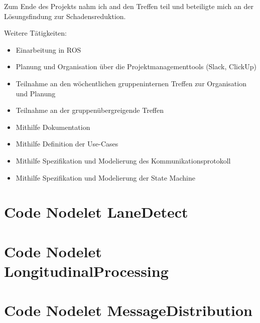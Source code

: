 \documentclass[a4paper, 12pt, titlepage]{scrartcl}
\begin{document}
{	Zum Ende des Projekts nahm ich and den Treffen teil und beteiligte mich an der Lösungsfindung zur Schadensreduktion.
	
	Weitere Tätigkeiten:
	\begin{itemize}
	\item Einarbeitung in ROS
	\item Planung und Organisation über die Projektmanagementtools (Slack, ClickUp)
	\item Teilnahme an den wöchentlichen gruppeninternen Treffen zur Organisation und Planung
	\item Teilnahme an der gruppenübergreigende Treffen 
	\item Mithilfe Dokumentation
	\item Mithilfe Definition der Use-Cases
	\item Mithilfe Spezifikation und Modelierung des Kommunikationsprotokoll
	\item Mithilfe Spezifikation und Modelierung der State Machine
	\end{itemize}
\newpage
\printbibliography

%
\renewcommand\appendixtocname{Anhang} %
\renewcommand\appendixpagename{Anhang}
\renewcommand\appendixname{Anhang}

\newpage
\begin{appendices}
\section{Code Nodelet LaneDetect}
\lstset{style=customcpp,inputpath=../modules/platooning_ws/src/platooning/include/platooning}

\lstset{style=customcpp,inputpath=../modules/platooning_ws/src/platooning/src}

\section{Code Nodelet LongitudinalProcessing}
\lstset{style=customcpp,inputpath=../modules/platooning_ws/src/platooning/include/platooning}

\lstset{style=customcpp,inputpath=../modules/platooning_ws/src/platooning/src}

\section{Code Nodelet MessageDistribution}
\lstset{style=customcpp,inputpath=../modules/platooning_ws/src/platooning/include/platooning}

\lstset{style=customcpp,inputpath=../modules/platooning_ws/src/platooning/src}


\end{appendices}}
\end{document}

